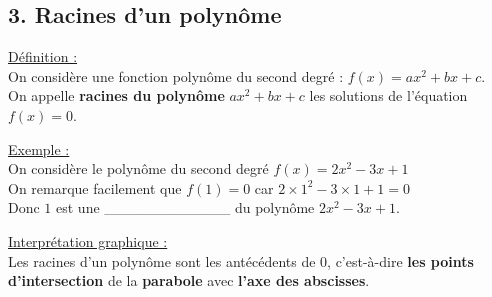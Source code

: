 \documentclass[12pt]{article}
\begin{document}
\subsection*{3. Racines d'un polynôme}

\begin{mdframed}[
    linewidth=1pt,
    roundcorner=5pt,
    linecolor=ForestGreen
]
{\color{ForestGreen}\underline{Définition :}}
    \vspace{5pt}
    \\On considère une fonction polynôme du second degré : $f(x) = ax^2 + bx + c$.
    \\On appelle \textbf{racines du polynôme} $ax^2 + bx + c$ les solutions de l'équation $f(x) = 0$.
\end{mdframed}

\begin{mdframed}
    \underline{Exemple :}
    \vspace{5pt}
    \\On considère le polynôme du second degré $f(x) = 2x^2-3x+1$
    \vspace{5pt}
    \\On remarque facilement que $f(1) = 0$ car $2 \times 1^2 -3 \times 1 +1 = 0$
    \vspace{5pt}
    \\Donc $1$ est une \_\_\_\_\_\_\_\_\_\_\_\_ du polynôme $2x^2-3x+1$.
\end{mdframed}

\begin{mdframed}[
    linewidth=1pt,
    roundcorner=5pt,
    linecolor=ForestGreen
]
{\color{ForestGreen}\underline{Interprétation graphique :}}
    \vspace{5pt}
    \\Les racines d'un polynôme sont les antécédents de $0$, c'est-à-dire \textbf{les points d'intersection} de la \textbf{parabole} avec \textbf{l'axe des abscisses}.
\end{mdframed}

\begin{center}
\end{center}
\end{document}
